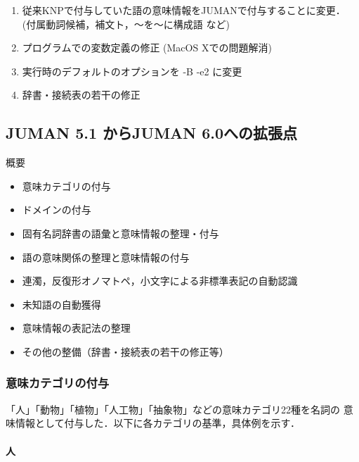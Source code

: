 \documentclass[a4j,titlepage]{jarticle}
\begin{document}
\begin{enumerate}
\item 従来KNPで付与していた語の意味情報をJUMANで付与することに変更．
      (付属動詞候補，補文ト，〜を〜に構成語 など)

\item プログラムでの変数定義の修正 (MacOS Xでの問題解消)

\item 実行時のデフォルトのオプションを -B -e2 に変更

\item 辞書・接続表の若干の修正
\end{enumerate}


\subsection{JUMAN 5.1 からJUMAN 6.0への拡張点}
\label{subsec:6.0}

概要
\begin{itemize}
\item 意味カテゴリの付与
\item ドメインの付与
\item 固有名詞辞書の語彙と意味情報の整理・付与
\item 語の意味関係の整理と意味情報の付与
\item 連濁，反復形オノマトペ，小文字による非標準表記の自動認識
\item 未知語の自動獲得
\item 意味情報の表記法の整理
\item その他の整備（辞書・接続表の若干の修正等）
\end{itemize}

\subsubsection{意味カテゴリの付与}

「人」「動物」「植物」「人工物」「抽象物」などの意味カテゴリ22種を名詞の
意味情報として付与した．以下に各カテゴリの基準，具体例を示す．


\paragraph{人}
\end{document}
